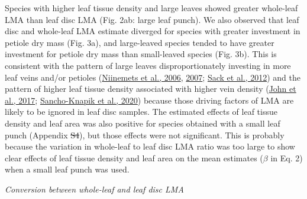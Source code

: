 \documentclass[
  12pt,
  a4paper,
,tablecaptionabove
]{scrartcl}
\providecommand{\DIFaddtex}[1]{{\protect\color{blue}\uwave{#1}}} %
\providecommand{\DIFdeltex}[1]{{\protect\color{red}\sout{#1}}}                      %
\providecommand{\DIFaddbegin}{} %
\providecommand{\DIFaddend}{} %
\providecommand{\DIFdelbegin}{} %
\providecommand{\DIFdelend}{} %
\providecommand{\DIFadd}[1]{\texorpdfstring{\DIFaddtex{#1}}{#1}} %
\providecommand{\DIFdel}[1]{\texorpdfstring{\DIFdeltex{#1}}{}} %
\begin{document}
Species with higher leaf tissue density and large leaves showed greater whole-leaf LMA than leaf disc LMA (Fig. 2ab: large leaf punch).
We also observed that leaf disc and whole-leaf LMA estimate diverged for species with greater investment in petiole dry mass (Fig. 3a), and large-leaved species tended to have greater investment for petiole dry mass than small-leaved species (Fig. 3b).
This is consistent with the pattern of large leaves disproportionately investing in more leaf veins and/or petioles (\protect\hyperlink{ref-Niinemets2006}{Niinemets et al., 2006}, \protect\hyperlink{ref-Niinemets2007}{2007}; \protect\hyperlink{ref-Sack2012}{Sack et al., 2012}) and the pattern of higher leaf tissue density associated with higher vein density (\protect\hyperlink{ref-John2017}{John et al., 2017}; \protect\hyperlink{ref-Sancho-Knapik2020}{Sancho-Knapik et al., 2020}) because those driving factors of LMA are likely to be ignored in leaf disc samples.
The estimated effects of leaf tissue density and leaf area was also positive for species obtained with a small leaf punch (Appendix \DIFdelbegin \DIFdel{S4}\DIFdelend \DIFaddbegin \DIFadd{S1, Figure S3}\DIFaddend ), but those effects were not significant.
This is probably because the variation in whole-leaf to leaf disc LMA ratio was too large to show clear effects of leaf tissue density and leaf area on the mean estimates (\(\beta\) in Eq. 2) when a small leaf punch was used.

\emph{Conversion between whole-leaf and leaf disc LMA}
\end{document}
